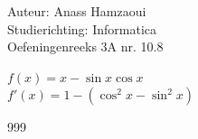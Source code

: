 \documentclass[a4paper]{article}
\begin{document}
  
\noindent \large Auteur: Anass Hamzaoui \\
\noindent \large Studierichting: Informatica \\
\noindent \large Oefeningenreeks 3A nr. 10.8\\

\medskip

\normalsize

$f(x) = x - \sin x \cos x$ \\

$f'(x) = 1 - (\cos^2 x - \sin^2 x)$ \\

\begin{thebibliography}{999}
\end{thebibliography}
\end{document}
